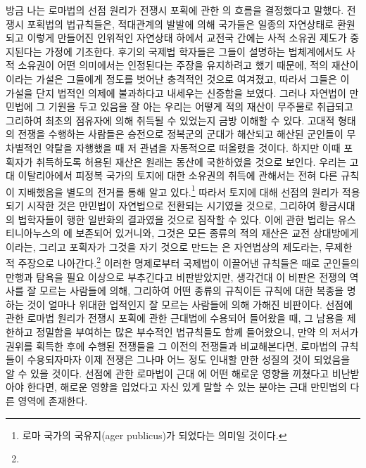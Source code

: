 방금 나는 로마법의 선점 원리가
전쟁시 포획에 관한 의 흐름을 결정했다고 말했다.
전쟁시 포획법의 법규칙들은,
적대관계의 발발에 의해 국가들은 일종의 자연상태로 환원되고
이렇게 만들어진 인위적인 자연상태 하에서
교전국 간에는
사적 소유권 제도가
중지된다는
가정에 기초한다.
후기의 국제법 학자들은
그들이 설명하는 법체계에서도
사적 소유권이 어떤 의미에서는 인정된다는 주장을
유지하려고 했기 때문에,
적의 재산이 이라는 가설은 그들에게
정도를 벗어난 충격적인 것으로 여겨졌고,
따라서 그들은 이 가설을 단지 법적인 의제에 불과하다고
내세우는 신중함을 보였다.
그러나 자연법이 만민법에 그 기원을 두고 있음을 잘 아는 우리는
어떻게 적의 재산이 무주물로 취급되고 그리하여
최초의 점유자에 의해 취득될 수 있었는지 금방 이해할 수 있다.
고대적 형태의 전쟁을 수행하는 사람들은
승전으로 정복군의 군대가 해산되고
해산된 군인들이 무차별적인 약탈을 자행했을 때
저 관념을 자동적으로 떠올렸을 것이다.
하지만
이때 포획자가 취득하도록 허용된 재산은
원래는 동산에 국한하였을 것으로 보인다.
우리는
고대 이탈리아에서
피정복 국가의 토지에 대한 소유권의 취득에 관해서는
전혀 다른 규칙이 지배했음을 별도의 전거를 통해 알고 있다.\footnote{%
  로마 국가의 국유지(ager publicus)가 되었다는 의미일 것이다. }
따라서 토지에 대해 선점의 원리가 적용되기 시작한 것은
만민법이 자연법으로 전환되는 시기였을 것으로,
그리하여 황금시대의 법학자들이 행한 일반화의 결과였을 것으로
짐작할 수 있다.
이에 관한 법리는 유스티니아누스의 에 보존되어 있거니와,
그것은 모든 종류의 적의 재산은 교전 상대방에게 이라는,
그리고 포획자가 그것을 자기 것으로 만드는 은 자연법상의 제도라는,
무제한적 주장으로 나아간다.\footnote{%
   }
이러한 명제로부터 국제법이 이끌어낸 규칙들은
때로 군인들의 만행과 탐욕을 필요 이상으로 부추긴다고
비판받았지만,
생각건대 이 비판은
전쟁의 역사를 잘 모르는 사람들에 의해,
그리하여 어떤 종류의 규칙이든 규칙에 대한 복종을 명하는 것이
얼마나 위대한 업적인지 잘 모르는 사람들에 의해 가해진 비판이다.
선점에 관한 로마법 원리가 전쟁시 포획에 관한 근대법에 수용되어 들어왔을 때,
그 남용을 제한하고 정밀함을 부여하는
많은 부수적인 법규칙들도 함께 들어왔으니,
만약 의 저서가 권위를 획득한 후에 수행된 전쟁들을
그 이전의 전쟁들과 비교해본다면,
로마법의 규칙들이 수용되자마자 이제 전쟁은 그나마 어느 정도
인내할 만한 성질의 것이 되었음을 알 수 있을 것이다.
선점에 관한 로마법이 근대 에
어떤 해로운 영향을 끼쳤다고 비난받아야 한다면,
해로운 영향을 입었다고 자신 있게 말할 수 있는
분야는
근대 만민법의 다른 영역에 존재한다.
